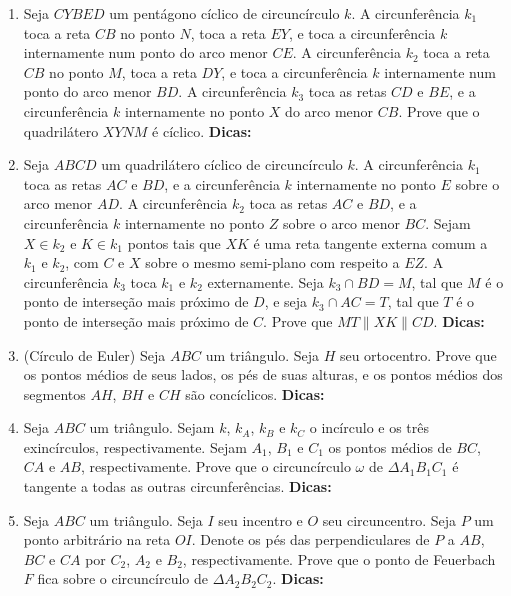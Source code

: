 \documentclass{article}
\newcommand{\dica}{\textbf{Dicas:}}
\newcommand{\iniTri}{Seja $ABC$ um triângulo}
\begin{document}
\begin{multicols}{2}
\begin{enumerate}
    \item Seja $CYBED$ um pentágono cíclico de circuncírculo $k$. A circunferência $k_1$ toca a reta $CB$ no ponto $N$, toca a reta $EY$, e toca a circunferência $k$ internamente num ponto do arco menor $CE$. A circunferência $k_2$ toca a reta $CB$ no ponto $M$, toca a reta $DY$, e toca a circunferência $k$ internamente num ponto do arco menor $BD$. A circunferência $k_3$ toca as retas $CD$ e $BE$, e a circunferência $k$ internamente no ponto $X$ do arco menor $CB$. Prove que o quadrilátero $XYNM$ é cíclico. \dica %
    
    \item Seja $ABCD$ um quadrilátero cíclico de circuncírculo $k$. A circunferência $k_1$ toca as retas $AC$ e $BD$, e a circunferência $k$ internamente no ponto $E$ sobre o arco menor $AD$. A circunferência $k_2$ toca as retas $AC$ e $BD$, e a circunferência $k$ internamente no ponto $Z$ sobre o arco menor $BC$. Sejam $X\in k_2$ e $K\in k_1$ pontos tais que $XK$ é uma reta tangente externa comum a $k_1$ e $k_2$, com $C$ e $X$ sobre o mesmo semi-plano com respeito a $EZ$. A circunferência $k_3$ toca $k_1$ e $k_2$ externamente. Seja $k_3\cap BD=M$, tal que $M$ é o ponto de interseção mais próximo de $D$, e seja $k_3\cap AC=T$, tal que $T$ é o ponto de interseção mais próximo de $C$. Prove que $MT\parallel XK\parallel CD$. \dica %
    
    \item (Círculo de Euler) \iniTri. Seja $H$ seu ortocentro. Prove que os pontos médios de seus lados, os pés de suas alturas, e os pontos médios dos segmentos $AH$, $BH$ e $CH$ são concíclicos. \dica %
    
    \item \iniTri. Sejam $k$, $k_A$, $k_B$ e $k_C$ o incírculo e os três exincírculos, respectivamente. Sejam $A_1$, $B_1$ e $C_1$ os pontos médios de $BC$, $CA$ e $AB$, respectivamente. Prove que o circuncírculo $\omega$ de $\Delta A_1B_1C_1$ é tangente a todas as outras circunferências. \dica %
    
    \item \iniTri. Seja $I$ seu incentro e $O$ seu circuncentro. Seja $P$ um ponto arbitrário na reta $OI$. Denote os pés das perpendiculares de $P$ a $AB$, $BC$ e $CA$ por $C_2$, $A_2$ e $B_2$, respectivamente. Prove que o ponto de Feuerbach $F$ fica sobre o circuncírculo de $\Delta A_2B_2C_2$. \dica %
    

\end{enumerate}
\end{multicols}
\end{document}
